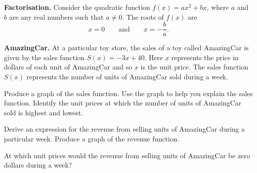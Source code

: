\documentclass[a4paper,oneside,12pt]{article}
\begin{document}
\begin{theorem}
\label{thm:quadratic_function_vertical_intercept_zero}
\textbf{Factorisation.}
Consider the quadratic function $f(x) = ax^2 + bx$, where $a$ and $b$
are any real numbers such that $a \neq 0$.  The roots of $f(x)$ are
\[
x = 0
\qquad
\text{and}
\qquad
x = -\frac{b}{a}.
\]
\end{theorem}

\begin{example}
\label{eg:AmazingCar}
\textbf{AmazingCar.}
At a particular toy store, the sales of a toy called AmazingCar is
given by the sales function $S(x) = -3x + 40$.  Here $x$ represents
the price in dollars of each unit of AmazingCar and so $x$ is the unit
price.  The sales function $S(x)$ represents the number of units of
AmazingCar sold during a week.
\begin{packedenum}
\item\label{subeg:AmazingCar_graph_sales_function}
  Produce a graph of the sales function.  Use the graph to help you
  explain the sales function.  Identify the unit prices at which the
  number of units of AmazingCar sold is highest and lowest.

\item\label{subeg:AmazingCar_revenue_function}
  Derive an expression for the revenue from selling units of
  AmazingCar during a particular week.  Produce a graph of the revenue
  function.

\item\label{subeg:AmazingCar_price_zero_revenue}
  At which unit prices would the revenue from selling units of
  AmazingCar be zero dollars during a week?
\end{packedenum}
\end{example}
\end{document}
